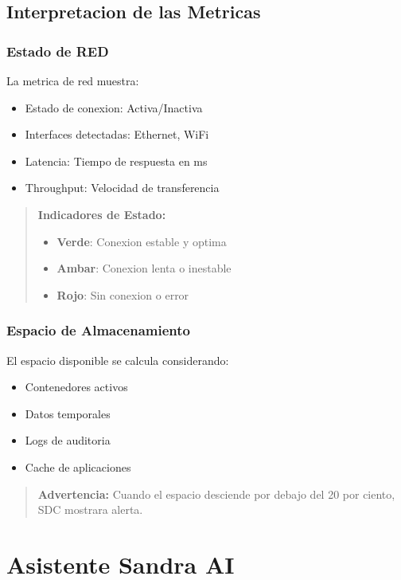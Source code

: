 \subsection{Interpretacion de las Metricas}

\subsubsection{Estado de RED}

La metrica de red muestra:
\begin{itemize}[leftmargin=*]
    \item Estado de conexion: Activa/Inactiva
    \item Interfaces detectadas: Ethernet, WiFi
    \item Latencia: Tiempo de respuesta en ms
    \item Throughput: Velocidad de transferencia
\end{itemize}

\begin{quote}
\textbf{Indicadores de Estado:}
\begin{itemize}
    \item \textbf{Verde}: Conexion estable y optima
    \item \textbf{Ambar}: Conexion lenta o inestable
    \item \textbf{Rojo}: Sin conexion o error
\end{itemize}
\end{quote}

\subsubsection{Espacio de Almacenamiento}

El espacio disponible se calcula considerando:
\begin{itemize}[leftmargin=*]
    \item Contenedores activos
    \item Datos temporales
    \item Logs de auditoria
    \item Cache de aplicaciones
\end{itemize}

\begin{quote}
\textbf{Advertencia:} Cuando el espacio desciende por debajo del 20 por ciento, SDC mostrara alerta.
\end{quote}

\section{Asistente Sandra AI}
\label{sec:sandra-ai}

